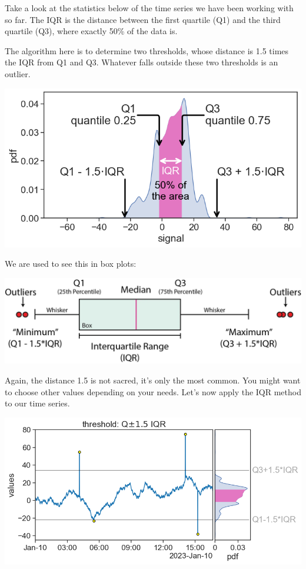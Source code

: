 \documentclass[
  letterpaper,
  DIV=11,
  numbers=noendperiod,
  oneside]{scrreprt}
\begin{document}
Take a look at the statistics below of the time series we have been
working with so far. The IQR is the distance between the first quartile
(Q1) and the third quartile (Q3), where exactly 50\% of the data is.

The algorithm here is to determine two thresholds, whose distance is 1.5
times the IQR from Q1 and Q3. Whatever falls outside these two
thresholds is an outlier.

\includegraphics{outliers/IQR_pdf.png}

We are used to see this in box plots:

\includegraphics{outliers/iqr1.png}


Again, the distance 1.5 is not sacred, it's only the most common. You
might want to choose other values depending on your needs. Let's now
apply the IQR method to our time series.

\includegraphics{outliers/outliers_1.5IQR.png}
\end{document}

